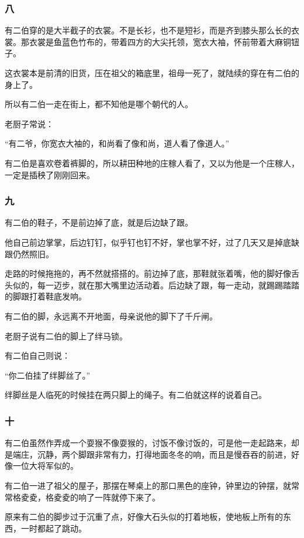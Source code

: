 \subsubsection*{八}
\par 有二伯穿的是大半截子的衣裳。不是长衫，也不是短衫，而是齐到膝头那么长的衣裳。那衣裳是鱼蓝色竹布的，带着四方的大尖托领，宽衣大袖，怀前带着大麻铜钮子。
\par 这衣裳本是前清的旧货，压在祖父的箱底里，祖母一死了，就陆续的穿在有二伯的身上了。
\par 所以有二伯一走在街上，都不知他是哪个朝代的人。
\par 老厨子常说：
\par “有二爷，你宽衣大袖的，和尚看了像和尚，道人看了像道人。”
\par 有二伯是喜欢卷着裤脚的，所以耕田种地的庄稼人看了，又以为他是一个庄稼人，一定是插秧了刚刚回来。
\subsubsection*{九}
\par 有二伯的鞋子，不是前边掉了底，就是后边缺了跟。
\par 他自己前边掌掌，后边钉钉，似乎钉也钉不好，掌也掌不好，过了几天又是掉底缺跟仍然照旧。
\par 走路的时候拖拖的，再不然就搭搭的。前边掉了底，那鞋就张着嘴，他的脚好像舌头似的，每一迈步，就在那大嘴里边活动着。后边缺了跟，每一走动，就踢踢踏踏的脚跟打着鞋底发响。
\par 有二伯的脚，永远离不开地面，母亲说他的脚下了千斤闸。
\par 老厨子说有二伯的脚上了绊马锁。
\par 有二伯自己则说：
\par “你二伯挂了绊脚丝了。”
\par 绊脚丝是人临死的时候挂在两只脚上的绳子。有二伯就这样的说着自己。
\subsubsection*{十}
\par 有二伯虽然作弄成一个耍猴不像耍猴的，讨饭不像讨饭的，可是他一走起路来，却是端庄，沉静，两个脚跟非常有力，打得地面冬冬的响，而且是慢吞吞的前进，好像一位大将军似的。
\par 有二伯一进了祖父的屋子，那摆在琴桌上的那口黑色的座钟，钟里边的钟摆，就常常格夌夌，格夌夌的响了一阵就停下来了。
\par 原来有二伯的脚步过于沉重了点，好像大石头似的打着地板，使地板上所有的东西，一时都起了跳动。
